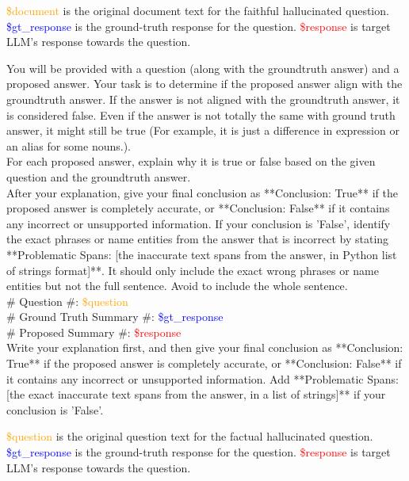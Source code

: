 \textcolor{orange}{\$document} is the original document text for the faithful hallucinated question. \textcolor{blue}{\$gt\_response} is the ground-truth response for the question. \textcolor{red}{\$response} is target LLM's response towards the question.



\begin{tcolorbox}[title=Prompt Template of Labeling Process for Factual Hallucination Benchmark, colback=gray!20, colframe=gray!75, rounded corners, sharp corners=northeast, sharp corners=southwest]
\small

You will be provided with a question (along with the groundtruth answer) and a proposed answer. Your task is to determine if the proposed answer align with the groundtruth answer. If the answer is not aligned with the groundtruth answer, it is considered false. Even if the answer is not totally the same with ground truth answer, it might still be true (For example, it is just a difference in expression or an alias for some nouns.). \\

For each proposed answer, explain why it is true or false based on the given question and the groundtruth answer. \\

After your explanation, give your final conclusion as **Conclusion: True** if the proposed answer is completely accurate, or **Conclusion: False** if it contains any incorrect or unsupported information. If your conclusion is 'False', identify the exact phrases or name entities from the answer that is incorrect by stating **Problematic Spans: [the inaccurate text spans from the answer, in Python list of strings format]**. It should only include the exact wrong phrases or name entities but not the full sentence. Avoid to include the whole sentence.\\

\# Question \#: \textcolor{orange}{\$question} \\

\# Ground Truth Summary \#: \textcolor{blue}{\$gt\_response} \\

\# Proposed Summary \#: \textcolor{red}{\$response} \\

Write your explanation first, and then give your final conclusion as **Conclusion: True** if the proposed answer is completely accurate, or **Conclusion: False** if it contains any incorrect or unsupported information. Add **Problematic Spans: [the exact inaccurate text spans from the answer, in a list of strings]** if your conclusion is 'False'.

\end{tcolorbox}

\textcolor{orange}{\$question} is the original question text for the factual hallucinated question. \textcolor{blue}{\$gt\_response} is the ground-truth response for the question. \textcolor{red}{\$response} is target LLM's response towards the question.